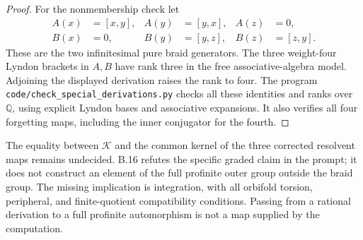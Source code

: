 \begin{proof}
For the nonmembership check let
\[
\begin{aligned}
 A(x)&=[x,y],& A(y)&=[y,x],& A(z)&=0,\\
 B(x)&=0,& B(y)&=[y,z],& B(z)&=[z,y].
\end{aligned}
\]
These are the two infinitesimal pure braid generators.
The three weight-four Lyndon brackets in \(A,B\) have rank three
in the free associative-algebra model. Adjoining the displayed
derivation raises the rank to four. The program
\texttt{code/check\_special\_derivations.py} checks all these
identities and ranks over \(\mathbb Q\), using explicit Lyndon
bases and associative expansions. It also verifies all four
forgetting maps, including the inner conjugator for the fourth.
\end{proof}

The equality between \(\mathcal K\) and the common kernel of the
three corrected resolvent maps remains undecided. B.16 refutes the
specific graded claim in the prompt; it does not construct an
element of the full profinite outer group outside the braid group.
The missing implication is integration, with all orbifold torsion,
peripheral, and finite-quotient compatibility conditions. Passing
from a rational derivation to a full profinite automorphism is not
a map supplied by the computation.
